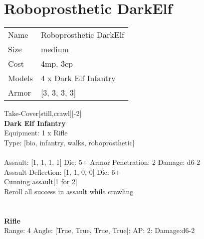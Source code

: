 \pagebreak\pagebreak

\section{ Roboprosthetic DarkElf }

\begin{tabular}{ll}
  Name & Roboprosthetic DarkElf \\
  Size & medium\\
  Cost & 4mp, 3cp\\
  Models & 4 x Dark Elf Infantry\\
  Armor & [3, 3, 3, 3]\\
\end{tabular}

\noindent Take-Cover[still,crawl][-2]\\ 


{\bf Dark Elf Infantry } \\
Equipment: 1 x Rifle \\
Type: [bio, infantry, walks, roboprosthetic] \\
\ \\
Assault: [1, 1, 1, 1] Die: 5+ Armor Penetration: 2 Damage: d6-2 \\
Assault Deflection: [1, 1, 0, 0] Die: 6+\\
\indent Cunning assault[1 for 2]\\ 
Reroll all success in assault while crawling\\ 
 
\ \\

\ \\
{\bf Rifle } \\



Range: 4  Angle: [True, True, True, True]: AP: 2: Damage:d6-2 \\




 
\ \\




